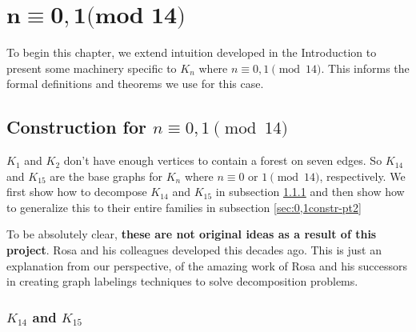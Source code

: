 \chapter{$\mathbf{n\equiv 0,1\textbf{(mod 14)}}$} \label{chap:0,1(mod 14)}

To begin this chapter, we extend intuition developed in the Introduction to present some machinery specific to $K_{n}$ where $n\equiv 0,1\pmod{14}$. This informs the formal definitions and theorems we use for this case.

\section{Construction for $n\equiv 0,1 \pmod{14}$}\label{sec:0,1constr}
$K_{1}$ and $K_{2}$ don't have enough vertices to contain a forest on seven edges. So $K_{14}$ and $K_{15}$ are the base graphs for $K_{n}$ where $n \equiv 0 \textrm{ or } 1 \pmod{14}$, respectively. We first show how to decompose $K_{14}$ and $K_{15}$ in subsection \ref{sec:0,1constr-pt1} and then show how to generalize this to their entire families in subsection \ref{sec:0,1constr-pt2}

To be absolutely clear, \textbf{these are not original ideas as a result of this project}. Rosa and his colleagues developed this decades ago. This is just an explanation from our perspective, of the amazing work of Rosa and his successors in creating graph labelings techniques to solve decomposition problems.

\subsection{$K_{14}$ and $K_{15}$}\label{sec:0,1constr-pt1}


